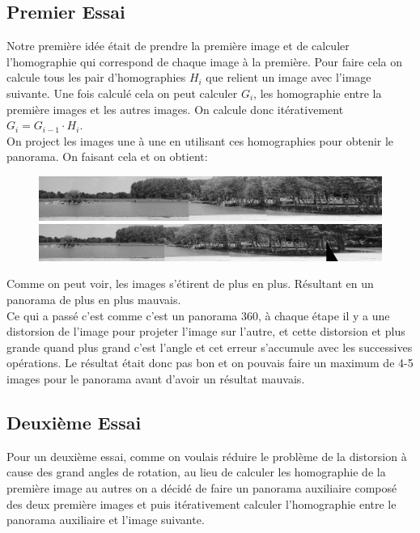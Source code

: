 \documentclass[11pt]{article}
\begin{document}
\subsection{Premier Essai}

Notre première idée était de prendre la première image et de calculer l’homographie qui correspond de chaque image à la première. Pour faire cela on calcule tous les pair d’homographies $H_i$ que relient un image avec l’image suivante. Une fois calculé cela on peut calculer $G_i$, les homographie entre la première images et les autres images. On calcule donc itérativement $G_i = G_{i-1} \cdot H_i$. \\
On project les images une à une en utilisant ces homographies pour obtenir le panorama. On faisant cela et on obtient: 

\begin{figure}[H]
\centering
\includegraphics[width=.8\textwidth]{../resources/output/homography_panorama4.jpg}
\includegraphics[width=.8\textwidth]{../resources/output/homography_panorama5.jpg}
\end{figure}

Comme on peut voir, les images s’étirent de plus en plus. Résultant en un panorama de plus en plus mauvais. \\
Ce qui a passé c’est comme c’est un panorama 360, à chaque étape il y a une distorsion de l’image pour projeter l’image sur l’autre, et cette distorsion et plus grande quand plus grand c’est l’angle et cet erreur s’accumule avec les successives opérations. Le résultat était donc pas bon et on pouvais faire un maximum de 4-5 images pour le panorama avant d’avoir un résultat mauvais.

\subsection{Deuxième Essai}

Pour un deuxième essai, comme on voulais réduire le problème de la distorsion à cause des grand angles de rotation, au lieu de calculer les homographie de la première image au autres on a décidé de faire un panorama auxiliaire composé des deux première images et puis itérativement calculer l’homographie entre le panorama auxiliaire et l’image suivante.
\end{document}
